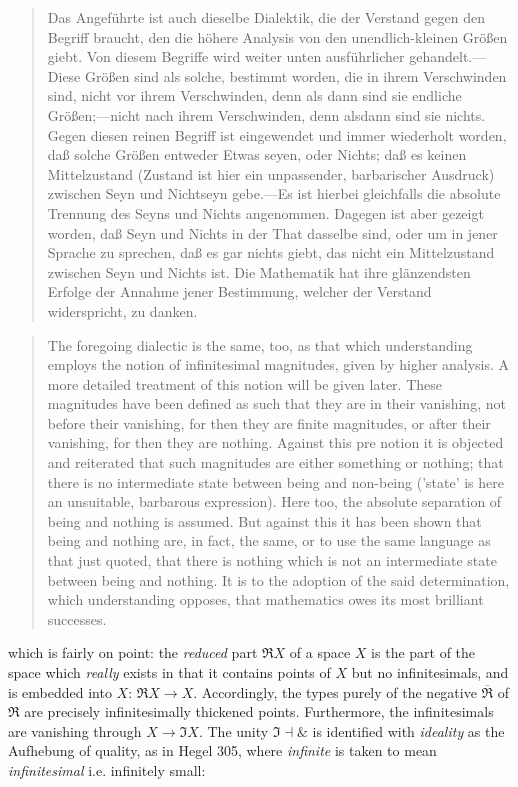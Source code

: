 \documentclass{article}
\begin{document}
\begin{quote}
    Das Angeführte ist auch dieselbe Dialektik, die der Verstand gegen den Begriff braucht, den die höhere Analysis von den unendlich-kleinen Größen giebt. Von diesem Begriffe wird weiter unten ausführlicher gehandelt.—Diese Größen sind als solche, bestimmt worden, die in ihrem Verschwinden sind, nicht vor ihrem Verschwinden, denn als dann sind sie endliche Größen;—nicht nach ihrem Verschwinden, denn alsdann sind sie nichts. Gegen diesen reinen Begriff ist eingewendet und immer wiederholt worden, daß solche Größen entweder Etwas seyen, oder Nichts; daß es keinen Mittelzustand (Zustand ist hier ein unpassender, barbarischer Ausdruck) zwischen Seyn und Nichtseyn gebe.—Es ist hierbei gleichfalls die absolute Trennung des Seyns und Nichts angenommen. Dagegen ist aber gezeigt worden, daß Seyn und Nichts in der That dasselbe sind, oder um in jener Sprache zu sprechen, daß es gar nichts giebt, das nicht ein Mittelzustand zwischen Seyn und Nichts ist. Die Mathematik hat ihre glänzendsten Erfolge der Annahme jener Bestimmung, welcher der Verstand widerspricht, zu danken.
\end{quote}

\begin{quote}
    The foregoing dialectic is the same, too, as that which understanding employs the notion of infinitesimal magnitudes, given by higher analysis. A more detailed treatment of this notion will be given later. These magnitudes have been defined as such that they are in their vanishing, not before their vanishing, for then they are finite magnitudes, or after their vanishing, for then they are nothing. Against this pre notion it is objected and reiterated that such magnitudes are either something or nothing; that there is no intermediate state between being and non-being ('state' is here an unsuitable, barbarous expression). Here too, the absolute separation of being and nothing is assumed. But against this it has been shown that being and nothing are, in fact, the same, or to use the same language as that just quoted, that there is nothing which is not an intermediate state between being and nothing. It is to the adoption of the said determination, which understanding opposes, that mathematics owes its most brilliant successes.
\end{quote}    

which is fairly on point: the \emph{reduced} part $\Re X$ of a space $X$ is the part of the space which \emph{really} exists in that it contains points of $X$ but no infinitesimals, and is embedded into $X$: $\Re X\rightarrow X$. Accordingly, the types purely of the negative $\overline{\Re}$ of $\Re$ are precisely infinitesimally thickened points. Furthermore, the infinitesimals are vanishing through $X\rightarrow \Im X$. The unity $\Im\dashv\&$ is identified with \emph{ideality} as the Aufhebung of quality, as in Hegel 305, where \emph{infinite} is taken to mean \emph{infinitesimal} i.e. infinitely small:
\end{document}
